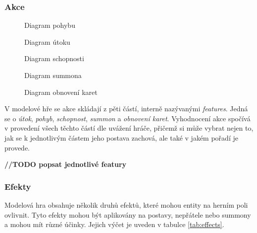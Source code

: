 \subsubsection*{Akce}
\label{subsubsec:actions}

\begin{figure}[H]
    \centering
    \caption{Diagram pohybu}
    \label{diag:movement}
\end{figure}

\begin{figure}[H]
    \centering
    \caption{Diagram útoku}
    \label{diag:attack}
\end{figure}

\begin{figure}[H]
    \centering
    \caption{Diagram schopnosti}
    \label{diag:skill}
\end{figure}

\begin{figure}[H]
    \centering
    \caption{Diagram summona}
    \label{diag:summon}
\end{figure}

\begin{figure}[H]
    \centering
    \caption{Diagram obnovení karet}
    \label{diag:restore_cards}
\end{figure}


V modelové hře se akce skládají z pěti částí, interně nazývanými \textit{features}. Jedná se o \textit{útok}, \textit{pohyb}, \textit{schopnost}, \textit{summon} a \textit{obnovení karet}. Vyhodnocení akce spočívá v provedení všech těchto částí dle uvážení hráče, přičemž si může vybrat nejen to, jak se k jednotlivým částem jeho postava zachová, ale také v jakém pořadí je provede.

\textbf{//TODO popsat jednotlivé featury}

\subsubsection*{Efekty}
\label{subsubsec:effects}

Modelová hra obsahuje několik druhů efektů, které mohou entity na herním poli ovlivnit. Tyto efekty mohou být aplikovány na postavy, nepřátele nebo summony a mohou mít různé účinky. Jejich výčet je uveden v tabulce \ref{tab:effects}.

